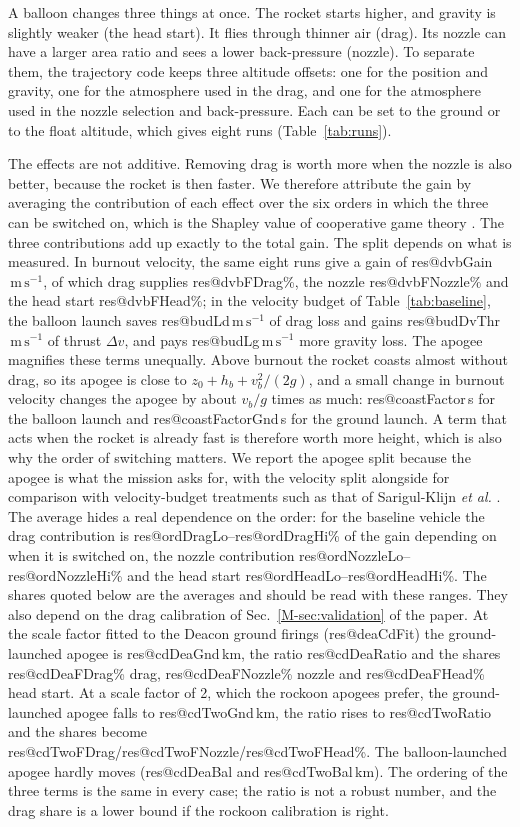 \documentclass[11pt,a4paper]{article}
\makeatletter
\newcommand{\R}[1]{\csname res@#1\endcsname}
\newcommand{\ms}{\,\mathrm{m\,s^{-1}}}
\makeatother
\begin{document}
A balloon changes three things at once. The rocket starts higher, and gravity is slightly weaker (the head start). It flies through thinner air (drag). Its nozzle can have a larger area ratio and sees a lower back-pressure (nozzle). To separate them, the trajectory code keeps three altitude offsets: one for the position and gravity, one for the atmosphere used in the drag, and one for the atmosphere used in the nozzle selection and back-pressure. Each can be set to the ground or to the float altitude, which gives eight runs (Table~\ref{tab:runs}).

The effects are not additive. Removing drag is worth more when the nozzle is also better, because the rocket is then faster. We therefore attribute the gain by averaging the contribution of each effect over the six orders in which the three can be switched on, which is the Shapley value of cooperative game theory \cite{shapley1953}. The three contributions add up exactly to the total gain. The split depends on what is measured. In burnout velocity, the same eight runs give a gain of \R{dvbGain}$\ms$, of which drag supplies \R{dvbFDrag}\%, the nozzle \R{dvbFNozzle}\% and the head start \R{dvbFHead}\%; in the velocity budget of Table~\ref{tab:baseline}, the balloon launch saves \R{budLd}$\ms$ of drag loss and gains \R{budDvThr}$\ms$ of thrust $\Delta v$, and pays \R{budLg}$\ms$ more gravity loss. The apogee magnifies these terms unequally. Above burnout the rocket coasts almost without drag, so its apogee is close to $z_0+h_b+v_b^2/(2g)$, and a small change in burnout velocity changes the apogee by about $v_b/g$ times as much: \R{coastFactor}\,s for the balloon launch and \R{coastFactorGnd}\,s for the ground launch. A term that acts when the rocket is already fast is therefore worth more height, which is also why the order of switching matters. We report the apogee split because the apogee is what the mission asks for, with the velocity split alongside for comparison with velocity-budget treatments such as that of Sarigul-Klijn \emph{et al.} \cite{sarigul2005}. The average hides a real dependence on the order: for the baseline vehicle the drag contribution is \R{ordDragLo}--\R{ordDragHi}\% of the gain depending on when it is switched on, the nozzle contribution \R{ordNozzleLo}--\R{ordNozzleHi}\% and the head start \R{ordHeadLo}--\R{ordHeadHi}\%. The shares quoted below are the averages and should be read with these ranges. They also depend on the drag calibration of Sec.~\ref{M-sec:validation} of the paper. At the scale factor fitted to the Deacon ground firings (\R{deaCdFit}) the ground-launched apogee is \R{cdDeaGnd}\,km, the ratio \R{cdDeaRatio} and the shares \R{cdDeaFDrag}\% drag, \R{cdDeaFNozzle}\% nozzle and \R{cdDeaFHead}\% head start. At a scale factor of 2, which the rockoon apogees prefer, the ground-launched apogee falls to \R{cdTwoGnd}\,km, the ratio rises to \R{cdTwoRatio} and the shares become \R{cdTwoFDrag}/\R{cdTwoFNozzle}/\R{cdTwoFHead}\%. The balloon-launched apogee hardly moves (\R{cdDeaBal} and \R{cdTwoBal}\,km). The ordering of the three terms is the same in every case; the ratio is not a robust number, and the drag share is a lower bound if the rockoon calibration is right.
\end{document}
